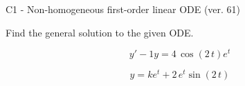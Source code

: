 \begin{exercise}
  \begin{exerciseTitle}C1 - Non-homogeneous first-order linear ODE (ver. 61)\end{exerciseTitle}
  \begin{exerciseStatement}
    
Find the general solution to the given ODE.

    
\[y'-1y= 4 \, \cos\left(2 \, t\right) e^{t}\]

  \end{exerciseStatement}
  \begin{exerciseAnswer}
    
\[y= k e^{t} + 2 \, e^{t} \sin\left(2 \, t\right)\]

  \end{exerciseAnswer}
\end{exercise}